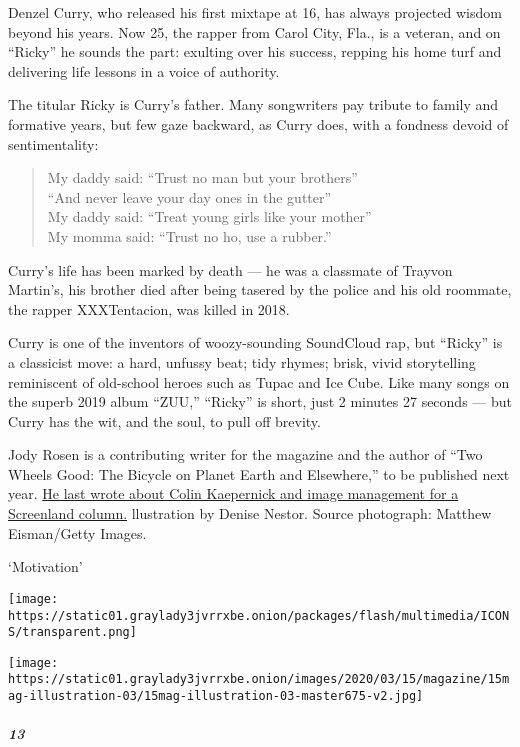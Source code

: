 Denzel Curry, who released his first mixtape at 16, has always projected
wisdom beyond his years. Now 25, the rapper from Carol City, Fla., is a
veteran, and on ``Ricky'' he sounds the part: exulting over his success,
repping his home turf and delivering life lessons in a voice of
authority.

The titular Ricky is Curry's father. Many songwriters pay tribute to
family and formative years, but few gaze backward, as Curry does, with a
fondness devoid of sentimentality:

\begin{quote}
My daddy said: ``Trust no man but your brothers''\\
``And never leave your day ones in the gutter''\\
My daddy said: ``Treat young girls like your mother''\\
My momma said: ``Trust no ho, use a rubber.''
\end{quote}

Curry's life has been marked by death --- he was a classmate of Trayvon
Martin's, his brother died after being tasered by the police and his old
roommate, the rapper XXXTentacion, was killed in 2018.

Curry is one of the inventors of woozy-sounding SoundCloud rap, but
``Ricky'' is a classicist move: a hard, unfussy beat; tidy rhymes;
brisk, vivid storytelling reminiscent of old-school heroes such as Tupac
and Ice Cube. Like many songs on the superb 2019 album ``ZUU,''
``Ricky'' is short, just 2 minutes 27 seconds --- but Curry has the wit,
and the soul, to pull off brevity.

Jody Rosen is a contributing writer for the magazine and the author of
``Two Wheels Good: The Bicycle on Planet Earth and Elsewhere,'' to be
published next year.
\href{https://www.nytimes3xbfgragh.onion/2019/12/12/magazine/colin-kaepernick-nfl-video.html}{He
last wrote about Colin Kaepernick and image management for a Screenland
column.} llustration by Denise Nestor. Source photograph: Matthew
Eisman/Getty Images.

`Motivation'

\texttt{[image: https://static01.graylady3jvrrxbe.onion/packages/flash/multimedia/ICONS/transparent.png]}

\texttt{[image: https://static01.graylady3jvrrxbe.onion/images/2020/03/15/magazine/15mag-illustration-03/15mag-illustration-03-master675-v2.jpg]}

\hypertarget{13}{%
\subparagraph{13}\label{13}}

